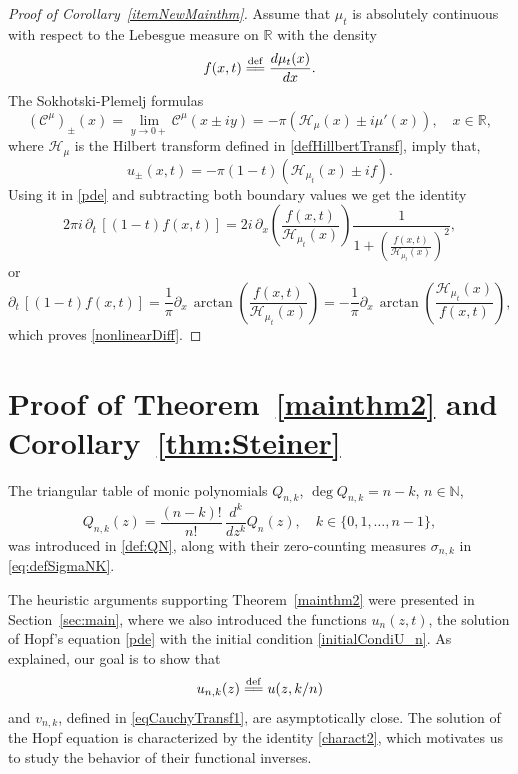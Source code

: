 \documentclass[reqno,11pt]{amsart}
\theoremstyle{plain}
\theoremstyle{definition}
\theoremstyle{remark}
\numberwithin{equation}{section}
\numberwithin{equation}{section}
\newcommand{\N}{\mathbb{N}}
\newcommand{\R}{\mathbb{R}}
\newcommand{\isdef}{\overset{\mathrm{def}}{=\joinrel=}}
\begin{document}
\begin{proof}[Proof of Corollary~\ref{itemNewMainthm}]
  Assume that $ \mu_t $ is absolutely continuous with respect to the Lebesgue measure on $\R$ with the density
 		$$
 		f(x,t) \isdef \frac{d\mu_t(x)}{dx}.
 		$$
The Sokhotski-Plemelj formulas 
  \begin{equation} \label{sokhotsky}
		\left(\mathcal C^\mu\right)_{\pm} (x) =  \lim_{y\to 0+} \mathcal C^\mu(x\pm i y) = -\pi \left( \mathcal H_{\mu}(x) \pm i \mu'(x) \right), \quad x \in \R,
	\end{equation}
where $\mathcal H_\mu$ is the Hilbert transform 
defined in \eqref{defHillbertTransf}, imply that,  
$$
u_{\pm} (x,t) = -\pi  (1-t) \left( \mathcal H_{\mu_t}(x) \pm i f \right).
$$
Using it in \eqref{pde} and subtracting both boundary values we get the identity
$$
2\pi i \, \partial_t\, \left[(1-t) f(x,t)\right]= 2i \, \partial_x  \left( \frac{f(x,t)}{\mathcal H_{\mu_t}(x)} \right) \frac{1}{1+ \left( \frac{f(x,t)}{\mathcal H_{\mu_t}(x)} \right)^2 },
$$
or 
$$
\partial_t\, \left[(1-t) f(x,t)\right]= \frac{1}{\pi}  \partial_x\, \arctan \left( \frac{f(x,t)}{\mathcal H_{\mu_t}(x)} \right) = - \frac{1}{\pi} \partial_x\, \arctan \left( \frac{\mathcal H_{\mu_t}(x)}{f(x,t)} \right) ,
$$
which proves \eqref{nonlinearDiff}. 
\end{proof}



\section{Proof of Theorem~\ref{mainthm2} and Corollary~\ref{thm:Steiner}} \label{sec:proofThm2}

The triangular table of monic polynomials $Q_{n,k}$, $\deg Q_{n,k}=n-k$, $n\in \N$,  
$$  
Q_{n,k}(z) =  \frac{(n-k)!}{n!}\, \frac{d^k}{dz^k } Q_n(z) , \quad k\in \{0, 1,\dots, n-1\},
$$  
was introduced in \eqref{def:QN}, along with their zero-counting measures $\sigma_{n,k}$ in \eqref{eq:defSigmaNK}. 

The heuristic arguments supporting Theorem~\ref{mainthm2} were presented in Section~\ref{sec:main}, where we also introduced the functions $u_n(z,t)$, the solution of Hopf's equation \eqref{pde} with the initial condition \eqref{initialCondiU_n}. As explained, our goal is to show that 
$$
u_{n,k}(z)\isdef u(z,k/n)
$$
and $v_{n,k}$, defined in \eqref{eqCauchyTransf1},  
are asymptotically close. The solution of the Hopf equation is characterized by the identity \eqref{charact2}, which motivates us to study the behavior of their functional inverses. 
\end{document}
